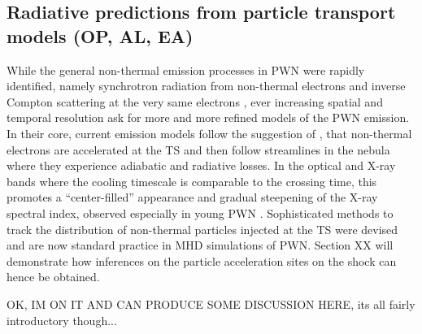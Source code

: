 \subsection{Radiative predictions from particle transport models      (OP, AL, EA)}

While the general non-thermal emission processes in PWN were rapidly identified, namely synchrotron radiation from non-thermal electrons and inverse Compton scattering at the very same electrons \citep{shklovsky1953,dombrovsky1954nature,atoyan1996}, ever increasing spatial and temporal resolution ask for more and more refined models of the PWN emission.
In their core, current emission models follow the suggestion of \cite{kennel1984}, that non-thermal electrons are accelerated at the TS and then follow streamlines in the nebula where they experience adiabatic and radiative losses.  In the optical and X-ray bands where the cooling timescale is comparable to the crossing time, this promotes a ``center-filled'' appearance and gradual steepening of the X-ray spectral index, observed especially in young PWN \citep[e.g.][]{SlaneChen2000,SlaneHelfand2004}.  
Sophisticated methods to track the distribution of non-thermal particles injected at the TS were devised \citep{del-zanna2006,camus2009} and are now standard practice in MHD simulations of PWN. Section XX will demonstrate how inferences on the particle acceleration sites on the shock can hence be obtained.

OK, IM ON IT AND CAN PRODUCE SOME DISCUSSION HERE, its all fairly introductory though...
